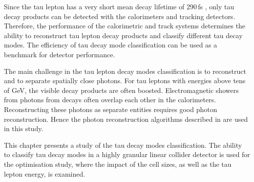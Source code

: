 Since the tau lepton has a very short mean decay lifetime of 290\,fs \cite{Abreu:1991jn}, only tau decay products can be detected with the calorimeters and tracking detectors. Therefore, the performance of the calorimetric and track systems determines the ability to reconstruct tau lepton decay products and classify different tau decay modes. The efficiency of tau decay mode classification can be used as a benchmark for detector performance.

The main challenge in the tau lepton decay modes  classification is to reconstruct and to separate spatially close photons. For  tau leptons with energies above tens of GeV, the visible decay products are often boosted.  Electromagnetic showers from photons from \Ppizero decays often overlap each other in the calorimeters.  Reconstructing these photons as separate entities requires good photon reconstruction. Hence the photon reconstruction algorithms described in  are used in this study.







%

This chapter presents a study of the tau decay modes classification. The ability to classify tau decay modes in a highly granular linear collider detector is used for the \ECAL optimisation study, where the impact of  the \ECAL cell sizes,  as well as the tau lepton energy, is examined.

